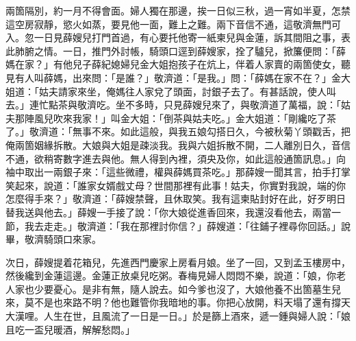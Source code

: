 兩箇隔別，約一月不得會面。婦人獨在那邊，挨一日似三秋，過一宵如半夏，怎禁這空房寂靜，慾火如蒸，要見他一面，難上之難。兩下音信不通，這敬濟無門可入。忽一日見薛嫂兒打門首過，有心要托他寄一紙柬兒與金蓮，訴其間阻之事，表此肺腑之情。一日，推門外討帳，騎頭口逕到薛嫂家，拴了驢兒，掀簾便問：「薛媽在家？」有他兒子薛紀媳婦兒金大姐抱孩子在炕上，伴着人家賣的兩箇使女，聽見有人叫薛媽，出來問：「是誰？」敬濟道：「是我。」問：「薛媽在家不在？」金大姐道：「姑夫請家來坐，俺媽往人家兌了頭面，討銀子去了。有甚話說，使人叫去。」連忙點茶與敬濟吃。坐不多時，只見薛嫂兒來了，與敬濟道了萬福，說：「姑夫那陣風兒吹來我家！」叫金大姐：「倒茶與姑夫吃。」金大姐道：「剛纔吃了茶了。」敬濟道：「無事不來。如此這般，與我五娘勾搭日久，今被秋菊丫頭戳舌，把俺兩箇姻緣拆散。大娘與大姐是疎淡我。我與六姐拆散不開，二人離別日久，音信不通，欲稍寄數字進去與他。無人得到內裡，須央及你，如此這般通箇訊息。」向袖中取出一兩銀子來：「這些微禮，權與薛媽買茶吃。」那薛嫂一聞其言，拍手打掌笑起來，說道：「誰家女婿戲丈母？世間那裡有此事！姑夫，你實對我說，端的你怎麼得手來？」敬濟道：「薛嫂禁聲，且休取笑。我有這柬貼封好在此，好歹明日替我送與他去。」薛嫂一手接了說：「你大娘從進香回來，我還沒看他去，兩當一節，我去走走。」敬濟道：「我在那裡討你信？」薛嫂道：「往鋪子裡尋你回話。」說畢，敬濟騎頭口來家。

次日，薛嫂提着花箱兒，先進西門慶家上房看月娘。坐了一回，又到孟玉樓房中，然後纔到金蓮這邊。金蓮正放桌兒吃粥。春梅見婦人悶悶不樂，說道：「娘，你老人家也少要憂心。是非有無，隨人說去。如今爹也沒了，大娘他養不出箇墓生兒來，莫不是也來路不明？他也難管你我暗地的事。你把心放開，料天塌了還有撐天大漢哩。人生在世，且風流了一日是一日。」{}於是篩上酒來，遞一鍾與婦人說：「娘且吃一盃兒暖酒，解解愁悶。」

